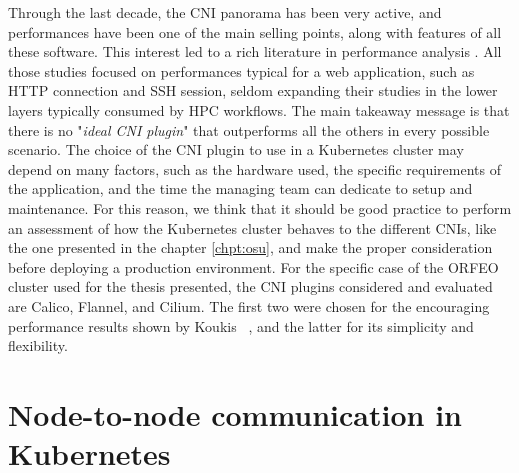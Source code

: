 Through the last decade, the CNI panorama has been very active, and performances
have been one of the main selling points, along with features of all these
software. This interest led to a rich literature in performance analysis
\cite{Kapoius2020,Kang2021, Qi_2021,Koukis2024}. All those studies focused on
performances typical for a web application, such as HTTP connection and SSH
session, seldom expanding their studies in the lower layers typically consumed
by HPC workflows. The main takeaway message is that there is no "\textit{ideal
CNI plugin}" that outperforms all the others in every possible scenario. The
choice of the CNI plugin to use in a Kubernetes cluster may depend on many
factors, such as the hardware used, the specific requirements of the
application, and the time the managing team can dedicate to setup and
maintenance. For this reason, we think that it should be good practice to
perform an assessment of how the Kubernetes cluster behaves to the different
CNIs, like the one presented in the chapter \ref{chpt:osu}, and make the proper
consideration before deploying a production environment. For the specific case
of the ORFEO cluster used for the thesis presented, the CNI plugins considered
and evaluated are Calico, Flannel, and Cilium. The first two were chosen for the
encouraging performance results shown by Koukis ~\cite{Koukis2024},
and the latter for its simplicity and flexibility.



\section{Node-to-node communication in Kubernetes}\label{sec:node2node}

